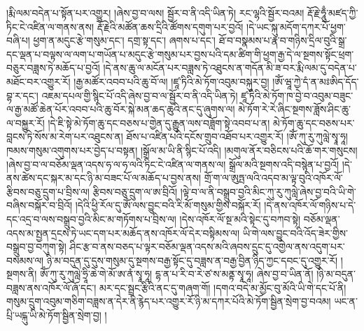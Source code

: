 །རྨི་ལམ་བདེན་པ་སྟོན་པར་འགྱུར། །ཞེས་བྱ་བ་ལས། སྦྱོར་བ་ནི་འདི་ཡིན་ཏེ། རང་ལྷའི་སྦྱོར་བའམ། རྡོ་རྗེ་ཧཱུྃ་མཛད་ཀྱི་ཏིང་ངེ་འཛིན་ལ་གནས་ནས། རྡོ་རྗེའི་མཚོན་ཆས་དྲིའི་ཚོགས་དགུག་པར་བྱའོ། །དེ་ཡང་སྐུ་མདོག་དཀར་པོ་ཕྱག་བཞི་པ། ཕྱག་ན་མདུང་རྩེ་གསུམ་དང་། དགྲ་སྟ་དང་། ཞགས་པ་དང་། ཐོ་བ་བསྣམས་པ་རྣ་བ་གཉིས་དྲིལ་བུའི་སྒྲ་དང་ལྡན་པ་བལྟས་ལ་ལག་པ་གཡོན་པ་མདུང་རྩེ་གསུམ་པར་བྱས་པའི་དམ་ཚིག་གི་ཕྱག་རྒྱ་དེ་ལ་སྔགས་སྟོང་ཕྲག་བཅུར་བཟླས་ཏེ་མཆོད་པ་བྱའོ། །དེ་ནས་ཆུ་ལ་མངོན་པར་བཟླས་ཏེ་འཐུངས་ན་གདོན་མི་ཟ་བར་རྨི་ལམ་དུ་བདེན་པ་མཐོང་བར་འགྱུར་རོ། །རྒྱ་མཚོར་འབབ་པའི་ཆུ་བོ་ལ། །ཛཱ་ཏིའི་མེ་ཏོག་འབུམ་བསྐུར་བྱ། །ཨོཾ་ཝཱ་ཀྱེ་དཾ་ན་མཿཨིད་དོད་བྷ་ར་དང་། འཇམ་དཔལ་གྱི་སྙིང་པོ་འདི་ཞེས་བྱ་བ་ལ་སྦྱོར་བ་ནི་འདི་ཡིན་ཏེ། ཛཱ་ཏིའི་མེ་ཏོག་ཁ་བྱེ་བ་འབུམ་བཟུང་ལ་རྒྱ་མཚོ་ཆེན་པོར་འབབ་པའི་ཆུ་བོར་སྐེ་མན་ཆད་ཆུའི་ནང་དུ་ཞུགས་ལ། མེ་ཏོག་རེ་རེ་ཞིང་སྔགས་ཟློས་ཤིང་ཆུ་ལ་བསྐྱུར་རོ། །དེ་ཇི་སྟེ་མེ་ཏོག་ཆུ་དང་བཅས་པ་གྱེན་དུ་རྒྱུན་ལས་བཟློག་སྟེ་འབབ་པ་ན། མེ་ཏོག་ཆུ་དང་བཅས་པར་བླངས་ཏེ་སོས་མ་རེག་པར་འཐུངས་ན། ཐོས་པ་འཛིན་པའི་དངོས་གྲུབ་འཐོབ་པར་འགྱུར་རོ། །ཨོཾ་ཀུ་རུ་ཀུལླེ་སྭཱ་ཧཱ། ཁམས་གསུམ་འགུགས་པར་བྱེད་པ་བསྟན། །སྒྲོལ་མ་ཡི་ནི་སྙིང་པོ་འདི། །མགུལ་ནོར་བཅིངས་པའི་ཆོ་གར་གསུངས། །ཞེས་བྱ་བ་ལ་བཅོམ་ལྡན་འདས་ཧ་ལ་ཧ་ལའི་ཏིང་ངེ་འཛིན་ལ་གནས་ལ། སྒྲོལ་མའི་སྔགས་འདི་བསྙེན་པ་བྱའོ། །དེ་ནས་ཚེས་དང་སྐར་མ་དང་ཉི་མ་བཟང་པོ་ལ་མཆོད་པ་བྱས་ནས། གྲོ་ག་ལ་ཨུཏྤ་ལའི་འདབ་མ་ལྟ་བུའི་འཁོར་ལོ་རྩིབས་བཅུ་དྲུག་པ་བྲིས་ལ། རྩིབས་བཅུ་དྲུག་ལ་ཨ་བྲིའོ། །ལྟེ་བ་ལ་ནི་བསྒྲུབ་བྱའི་མིང་ཀུ་རུ་ཀུལླེ་ཞེས་བྱ་བའི་ཡི་གེ་བཞིས་བསྐོར་བ་བྲིའོ། །དེའི་ཕྱི་རོལ་དུ་ཨོཾ་ལས་བྱུང་བའི་རི་མོ་གསུམ་གྱིས་བསྐོར་རོ། །དེ་ནས་འཁོར་ལོ་གཉིས་པ་དེ་དང་འདྲ་བ་ལས་བསྒྲུབ་བྱའི་མིང་མ་གཏོགས་པ་བྲིས་ལ། །དེས་འཁོར་ལོ་སྔ་མའི་སྟེང་དུ་བཀབ་སྟེ། བཅོམ་ལྡན་འདས་མ་སྤྱན་དྲངས་ཏེ་ཡང་དག་པར་མཆོད་ནས་འཁོར་ལོ་དེར་བསྟིམས་ལ། ཡི་གེ་ལས་བྱུང་བའི་འོད་ཟེར་གྱིས་བསྒྲུབ་བྱ་བཀུག་སྟེ། ཤིང་རྩ་བ་ནས་བཅད་པ་ལྟར་བཅོམ་ལྡན་འདས་མའི་ཞབས་དྲུང་དུ་འགྱེལ་ནས་འདུག་པར་བསམས་ལ། ཉི་མ་བདུན་དུ་དུས་གསུམ་དུ་སྔགས་བརྒྱ་སྟོང་དུ་བཟླས་ན་བརྒྱ་བྱིན་ཉིད་ཀྱང་དབང་དུ་འགྱུར་རོ། །སྔགས་ནི། ཨོཾ་ཀུ་རུ་ཀུལླེ་ཧྲཱི་ཆེ་གེ་མོ་ཨ་ནཾ་སྭཱ་ཧཱ། དྷ་ན་པ་རི་བ་རེ་ཙ་ས་མནྟ་སྭཱ་ཧཱ། ཞེས་བྱ་བ་ཡིན་ནོ། །ཉི་མ་བདུན་བཟླས་ནས་འཁོར་ལོ་ཞོ་དང་། མར་དང་སྦྲང་རྩིའི་ནང་དུ་གཞག་གོ། །དགའ་བདེ་མ་མྱོང་བུ་མོའི་ཡི་གེ་དང་པོ་ནི། གསུམ་དྲུག་འབུམ་གཅིག་བཟླས་ན་དེར་ནི་རྙེད་པར་འགྱུར་རོ་ཉི་མ་དཀར་པོའི་མེ་ཏོག་སྦྱིན་སྲེག་བྱ་བའམ། ཡང་ན་པྲི་ཡངྐུ་ཡི་མེ་ཏོག་སྦྱིན་སྲེག་བྱ། །
